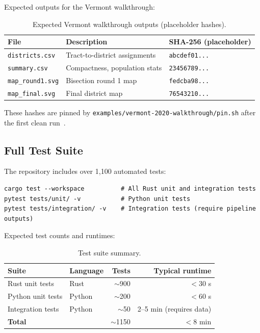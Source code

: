 \noindent Expected outputs for the Vermont walkthrough:

\begin{table}[h]
\centering
\caption{Expected Vermont walkthrough outputs (placeholder hashes).}
\label{tab:vt}
\begin{tabular}{@{}lll@{}}
\toprule
File & Description & SHA-256 (placeholder) \\
\midrule
\texttt{districts.csv}   & Tract-to-district assignments & \texttt{abcdef01...} \\
\texttt{summary.csv}     & Compactness, population stats & \texttt{23456789...} \\
\texttt{map\_round1.svg} & Bisection round 1 map         & \texttt{fedcba98...} \\
\texttt{map\_final.svg}  & Final district map            & \texttt{76543210...} \\
\bottomrule
\end{tabular}
\end{table}

\noindent These hashes are pinned by \texttt{examples/vermont-2020-walkthrough/pin.sh}
after the first clean run~\cite{vermont2020walkthrough}.

\subsection*{Full Test Suite}

The repository includes over 1,100 automated tests:

\begin{verbatim}
cargo test --workspace          # All Rust unit and integration tests
pytest tests/unit/ -v           # Python unit tests
pytest tests/integration/ -v    # Integration tests (require pipeline outputs)
\end{verbatim}

\noindent Expected test counts and runtimes:

\begin{table}[h]
\centering
\caption{Test suite summary.}
\label{tab:tests}
\begin{tabular}{@{}llrr@{}}
\toprule
Suite & Language & Tests & Typical runtime \\
\midrule
Rust unit tests       & Rust   & $\sim$900 & $<$30 s \\
Python unit tests     & Python & $\sim$200 & $<$60 s \\
Integration tests     & Python & $\sim$50  & 2--5 min (requires data) \\
\midrule
\textbf{Total}        &        & $\sim$1150 & $<$8 min \\
\bottomrule
\end{tabular}
\end{table}

